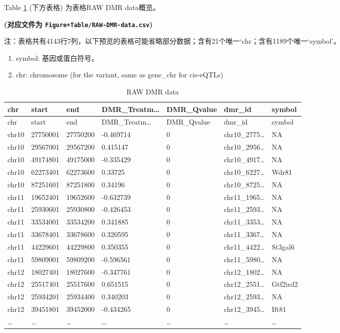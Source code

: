 \documentclass[
]{article}
\providecommand{\tightlist}{%
  \setlength{\itemsep}{0pt}\setlength{\parskip}{0pt}}
\begin{document}
\begin{center}\vspace{1.5cm}\end{center}

Table \ref{tab:RAW-DMR-data} (下方表格) 为表格RAW DMR data概览。

\textbf{(对应文件为 \texttt{Figure+Table/RAW-DMR-data.csv})}

\begin{center}\begin{tcolorbox}[colback=gray!10, colframe=gray!50, width=0.9\linewidth, arc=1mm, boxrule=0.5pt]注：表格共有4143行7列，以下预览的表格可能省略部分数据；含有21个唯一`chr；含有1189个唯一`symbol'。
\end{tcolorbox}
\end{center}
\begin{center}\begin{tcolorbox}[colback=gray!10, colframe=gray!50, width=0.9\linewidth, arc=1mm, boxrule=0.5pt]\begin{enumerate}\tightlist
\item symbol:  基因或蛋白符号。
\item chr:  chromosome (for the variant, same as gene\_chr for cis-eQTLs)
\end{enumerate}\end{tcolorbox}
\end{center}

\begin{longtable}[]{@{}lllllll@{}}
\caption{\label{tab:RAW-DMR-data}RAW DMR data}\tabularnewline
\toprule
chr & start & end & DMR\_Treatm\ldots{} & DMR\_Qvalue & dmr\_id & symbol\tabularnewline
\midrule
\endfirsthead
\toprule
chr & start & end & DMR\_Treatm\ldots{} & DMR\_Qvalue & dmr\_id & symbol\tabularnewline
\midrule
\endhead
chr10 & 27750001 & 27750200 & -0.469714 & 0 & chr10\_2775\ldots{} & NA\tabularnewline
chr10 & 29567001 & 29567200 & 0.415147 & 0 & chr10\_2956\ldots{} & NA\tabularnewline
chr10 & 49174801 & 49175000 & -0.335429 & 0 & chr10\_4917\ldots{} & NA\tabularnewline
chr10 & 62273401 & 62273600 & 0.33725 & 0 & chr10\_6227\ldots{} & Wdr81\tabularnewline
chr10 & 87251601 & 87251800 & 0.34196 & 0 & chr10\_8725\ldots{} & NA\tabularnewline
chr11 & 19652401 & 19652600 & -0.632739 & 0 & chr11\_1965\ldots{} & NA\tabularnewline
chr11 & 25930601 & 25930800 & -0.426453 & 0 & chr11\_2593\ldots{} & NA\tabularnewline
chr11 & 33534001 & 33534200 & 0.341885 & 0 & chr11\_3353\ldots{} & NA\tabularnewline
chr11 & 33678401 & 33678600 & 0.320595 & 0 & chr11\_3367\ldots{} & NA\tabularnewline
chr11 & 44229601 & 44229800 & 0.350355 & 0 & chr11\_4422\ldots{} & St3gal6\tabularnewline
chr11 & 59809001 & 59809200 & -0.596561 & 0 & chr11\_5980\ldots{} & NA\tabularnewline
chr12 & 18027401 & 18027600 & -0.347761 & 0 & chr12\_1802\ldots{} & NA\tabularnewline
chr12 & 25517401 & 25517600 & 0.651515 & 0 & chr12\_2551\ldots{} & Gtf2ird2\tabularnewline
chr12 & 25934201 & 25934400 & 0.340203 & 0 & chr12\_2593\ldots{} & NA\tabularnewline
chr12 & 39451801 & 39452000 & -0.434265 & 0 & chr12\_3945\ldots{} & Ift81\tabularnewline
\ldots{} & \ldots{} & \ldots{} & \ldots{} & \ldots{} & \ldots{} & \ldots{}\tabularnewline
\bottomrule
\end{longtable}
\end{document}
